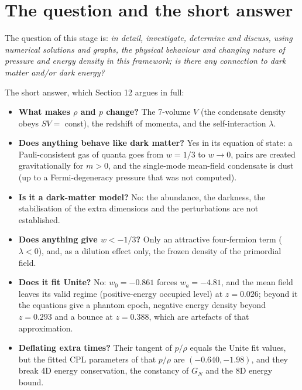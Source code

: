 \documentclass[11pt]{article}
\begin{document}
\begin{abstract}
are artefacts of the mean field, not established properties; no state with definite occupation numbers of positive-energy quanta of this Lagrangian is phantom (coherent pair states can violate the null energy condition transiently, but that is not the mechanism here). Deflating extra times give $p/\rho$ the tangent CPL parameters of the Unite fit, but the CPL fit of that $p/\rho$ over the data range is $(-0.640,-1.98)$, and they violate 4-dimensional energy conservation, imply $\dot G/G=2.63\,H_0$ and need a negative 8-dimensional energy density. Within everything computed here the framework does not provide viable dark energy, and it reproduces neither the Unite $(w_0,w_a)$ nor $w=-0.764$ consistently. All results are homogeneous and mean-field; no perturbations and no data likelihood were computed.

\end{abstract}

\section{The question and the short answer}

The question of this stage is: \emph{in detail, investigate, determine and discuss, using numerical solutions and graphs, the physical behaviour and changing nature of pressure and energy density in this framework; is there any connection to dark matter and/or dark energy?}

The short answer, which Section 12 argues in full:

\begin{itemize}
\item \textbf{What makes $\rho$ and $p$ change?} The 7-volume $V$ (the condensate density obeys $SV=$ const), the redshift of momenta, and the self-interaction $\lambda$.
\item \textbf{Does anything behave like dark matter?} Yes in its equation of state: a Pauli-consistent gas of quanta goes from $w=1/3$ to $w\to0$, pairs are created gravitationally for $m>0$, and the single-mode mean-field condensate is dust (up to a Fermi-degeneracy pressure that was not computed).
\item \textbf{Is it a dark-matter model?} No: the abundance, the darkness, the stabilisation of the extra dimensions and the perturbations are not established.
\item \textbf{Does anything give $w<-1/3$?} Only an attractive four-fermion term ($\lambda<0$), and, as a dilution effect only, the frozen density of the primordial field.
\item \textbf{Does it fit Unite?} No: $w_0=-0.861$ forces $w_a=-4.81$, and the mean field leaves its valid regime (positive-energy occupied level) at $z=0.026$; beyond it the equations give a phantom epoch, negative energy density beyond $z=0.293$ and a bounce at $z=0.388$, which are artefacts of that approximation.
\item \textbf{Deflating extra times?} Their tangent of $p/\rho$ equals the Unite fit values, but the fitted CPL parameters of that $p/\rho$ are $(-0.640,-1.98)$, and they break 4D energy conservation, the constancy of $G_N$ and the 8D energy bound.
\end{itemize}
\end{document}

